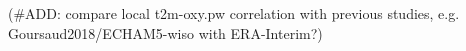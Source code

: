\documentclass[cp, manuscript]{copernicus}
\begin{document}
(\#ADD: compare local t2m-oxy.pw correlation with previous studies,
e.g. Goursaud2018/ECHAM5-wiso with ERA-Interim?)






























% 
% 
\end{document}
